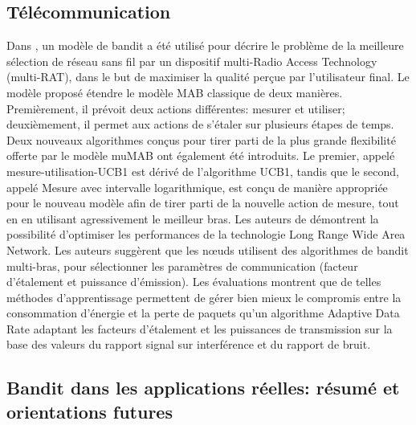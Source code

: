 \documentclass[conference]{IEEEtran}
\newcommand{\1}[1]{\mathbbm{1}_{\left\{#1\right\}}}
\begin{document}
\subsection{ Télécommunication}
Dans \cite{boldrini2018mumab}, un modèle de bandit a été utilisé pour décrire le problème de la meilleure sélection de réseau sans fil par un dispositif multi-Radio Access Technology (multi-RAT), dans le but de maximiser la qualité perçue par l'utilisateur final. Le modèle proposé étendre le modèle MAB classique de deux manières. Premièrement, il prévoit deux actions différentes: mesurer et utiliser; deuxièmement, il permet aux actions de s'étaler sur plusieurs étapes de temps. Deux nouveaux algorithmes conçus pour tirer parti de la plus grande flexibilité offerte par le modèle muMAB ont également été introduits. Le premier, appelé mesure-utilisation-UCB1 est dérivé de l'algorithme UCB1, tandis que le second, appelé Mesure avec intervalle logarithmique, est conçu de manière appropriée pour le nouveau modèle afin de tirer parti de la nouvelle action de mesure, tout en en utilisant agressivement le meilleur bras.
Les auteurs de \cite{KerkoucheAFVM18} démontrent la possibilité d'optimiser les performances de la technologie Long Range Wide Area Network. Les auteurs suggèrent que les nœuds utilisent des algorithmes de bandit multi-bras, pour sélectionner les paramètres de communication (facteur d'étalement et puissance d'émission). Les évaluations montrent que de telles méthodes d'apprentissage permettent de gérer bien mieux le compromis entre la consommation d'énergie et la perte de paquets qu'un algorithme Adaptive Data Rate adaptant les facteurs d'étalement et les puissances de transmission sur la base des valeurs du rapport signal sur interférence et du rapport de bruit.

 \subsection{Bandit dans les applications réelles: résumé et orientations futures}
 
\end{document}
